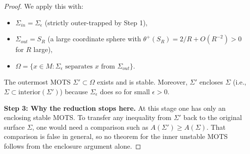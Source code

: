 \begin{proof}
We apply this with:
\begin{itemize}
    \item $\Sigma_{in} = \Sigma_\epsilon$ (strictly outer-trapped by Step 1),
    \item $\Sigma_{out} = S_R$ (a large coordinate sphere with $\theta^+(S_R) = 2/R + O(R^{-2}) > 0$ for $R$ large),
    \item $\Omega = \{x \in M : \Sigma_\epsilon \text{ separates } x \text{ from } \Sigma_{out}\}$.
\end{itemize}
The outermost MOTS $\Sigma' \subset \Omega$ exists and is stable. Moreover, $\Sigma'$ encloses $\Sigma$ (i.e., $\Sigma \subset \text{interior}(\Sigma')$) because $\Sigma_\epsilon$ does so for small $\epsilon > 0$.

\textbf{Step 3: Why the reduction stops here.}
At this stage one has only an enclosing stable MOTS. To transfer any inequality from $\Sigma'$ back to the original surface $\Sigma$, one would need a comparison such as $A(\Sigma') \ge A(\Sigma)$. That comparison is false in general, so no theorem for the inner unstable MOTS follows from the enclosure argument alone.
\end{proof}

